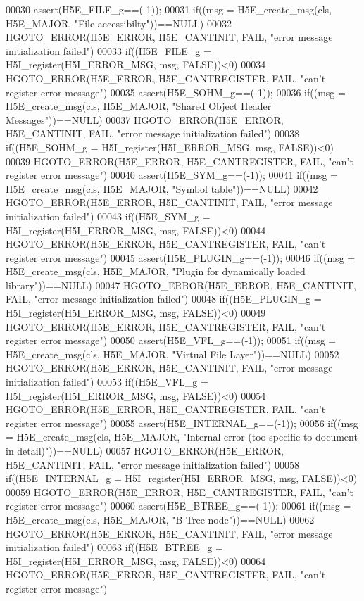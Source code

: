 \begin{DoxyCode}
00030 assert(H5E\_FILE\_g==(-1));
00031 if((msg = H5E\_create\_msg(cls, H5E\_MAJOR, "File accessibilty"))==NULL)
00032     HGOTO\_ERROR(H5E\_ERROR, H5E\_CANTINIT, FAIL, "error message initialization failed")
00033 if((H5E\_FILE\_g = H5I\_register(H5I\_ERROR\_MSG, msg, FALSE))<0)
00034     HGOTO\_ERROR(H5E\_ERROR, H5E\_CANTREGISTER, FAIL, "can't register error message")
00035 assert(H5E\_SOHM\_g==(-1));
00036 if((msg = H5E\_create\_msg(cls, H5E\_MAJOR, "Shared Object Header Messages"))==NULL)
00037     HGOTO\_ERROR(H5E\_ERROR, H5E\_CANTINIT, FAIL, "error message initialization failed")
00038 if((H5E\_SOHM\_g = H5I\_register(H5I\_ERROR\_MSG, msg, FALSE))<0)
00039     HGOTO\_ERROR(H5E\_ERROR, H5E\_CANTREGISTER, FAIL, "can't register error message")
00040 assert(H5E\_SYM\_g==(-1));
00041 if((msg = H5E\_create\_msg(cls, H5E\_MAJOR, "Symbol table"))==NULL)
00042     HGOTO\_ERROR(H5E\_ERROR, H5E\_CANTINIT, FAIL, "error message initialization failed")
00043 if((H5E\_SYM\_g = H5I\_register(H5I\_ERROR\_MSG, msg, FALSE))<0)
00044     HGOTO\_ERROR(H5E\_ERROR, H5E\_CANTREGISTER, FAIL, "can't register error message")
00045 assert(H5E\_PLUGIN\_g==(-1));
00046 if((msg = H5E\_create\_msg(cls, H5E\_MAJOR, "Plugin for dynamically loaded library"))==NULL)
00047     HGOTO\_ERROR(H5E\_ERROR, H5E\_CANTINIT, FAIL, "error message initialization failed")
00048 if((H5E\_PLUGIN\_g = H5I\_register(H5I\_ERROR\_MSG, msg, FALSE))<0)
00049     HGOTO\_ERROR(H5E\_ERROR, H5E\_CANTREGISTER, FAIL, "can't register error message")
00050 assert(H5E\_VFL\_g==(-1));
00051 if((msg = H5E\_create\_msg(cls, H5E\_MAJOR, "Virtual File Layer"))==NULL)
00052     HGOTO\_ERROR(H5E\_ERROR, H5E\_CANTINIT, FAIL, "error message initialization failed")
00053 if((H5E\_VFL\_g = H5I\_register(H5I\_ERROR\_MSG, msg, FALSE))<0)
00054     HGOTO\_ERROR(H5E\_ERROR, H5E\_CANTREGISTER, FAIL, "can't register error message")
00055 assert(H5E\_INTERNAL\_g==(-1));
00056 if((msg = H5E\_create\_msg(cls, H5E\_MAJOR, "Internal error (too specific to document in detail)"))==NULL)
00057     HGOTO\_ERROR(H5E\_ERROR, H5E\_CANTINIT, FAIL, "error message initialization failed")
00058 if((H5E\_INTERNAL\_g = H5I\_register(H5I\_ERROR\_MSG, msg, FALSE))<0)
00059     HGOTO\_ERROR(H5E\_ERROR, H5E\_CANTREGISTER, FAIL, "can't register error message")
00060 assert(H5E\_BTREE\_g==(-1));
00061 if((msg = H5E\_create\_msg(cls, H5E\_MAJOR, "B-Tree node"))==NULL)
00062     HGOTO\_ERROR(H5E\_ERROR, H5E\_CANTINIT, FAIL, "error message initialization failed")
00063 if((H5E\_BTREE\_g = H5I\_register(H5I\_ERROR\_MSG, msg, FALSE))<0)
00064     HGOTO\_ERROR(H5E\_ERROR, H5E\_CANTREGISTER, FAIL, "can't register error message")

\end{DoxyCode}
